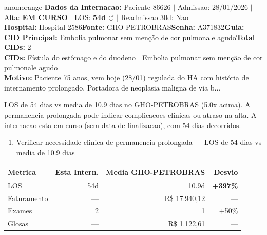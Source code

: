 \documentclass[a4paper,10pt]{article}
\begin{document}
\begin{anomalycard}[Internacao 163561 | GHO-PETROBRAS | ALTO (z=4.06)]{anomorange}
\textbf{Dados da Internacao:} Paciente 86626 $\mid$ Admissao: 28/01/2026 $\mid$ Alta: \textcolor{anomorange}{\textbf{EM CURSO}} $\mid$ LOS: \textbf{54d \textcolor{anomorange}{$\circlearrowleft$}} $\mid$ Readmissao 30d: Nao\\
\textbf{Hospital:} Hospital 2586\quad\textbf{Fonte:} GHO-PETROBRAS\quad\textbf{Senha:} A371832\quad\textbf{Guia:} ---\\
\textbf{CID Principal:} {\small Embolia pulmonar sem menção de cor pulmonale agudo}\quad\textbf{Total CIDs:} 2\\

\textbf{CIDs:} {\scriptsize Fístula do estômago e do duodeno | Embolia pulmonar sem menção de cor pulmonale agudo}\\

\textbf{Motivo:} {\scriptsize Paciente 75 anos, vem hoje (28/01) regulada do HA com história de internamento prolongado. Portadora de neoplasia maligna de via b...}\\

\vspace{2pt}\begin{tcolorbox}[colback=severityred!20,colframe=anomorange,title={\textbf{Interpretacao de Negocio}},fonttitle=\bfseries\small,left=4pt,right=4pt,top=3pt,bottom=3pt]
{\small LOS de 54 dias vs media de 10.9 dias no GHO-PETROBRAS (5.0x acima). A permanencia prolongada pode indicar complicacoes clinicas ou atraso na alta. A internacao esta em curso (sem data de finalizacao), com 54 dias decorridos.}
\end{tcolorbox}
\begin{tcolorbox}[colback=severityyellow!30,colframe=anomorange,title={\textbf{Recomendacoes Especificas}},fonttitle=\bfseries\small,left=4pt,right=4pt,top=3pt,bottom=3pt]
\begin{enumerate}[nosep,leftmargin=16pt]
\item {\small Verificar necessidade clinica de permanencia prolongada --- LOS de 54 dias vs media de 10.9 dias}
\end{enumerate}
\end{tcolorbox}
\begin{center}\begin{tabular}{l r r r}\toprule\textbf{Metrica} & \textbf{Esta Intern.} & \textbf{Media GHO-PETROBRAS} & \textbf{Desvio} \\\midrule
LOS & 54d & 10.9d & \textcolor{anomred}{\textbf{+397\%}} \\
Faturamento & --- & R\$ 17.940,12 & --- \\
Exames & 2 & 1 & \textcolor{anomorange}{+50\%} \\
Glosas & --- & R\$ 1.122,61 & --- \\
\bottomrule\end{tabular}\end{center}


\end{anomalycard}
\end{document}

